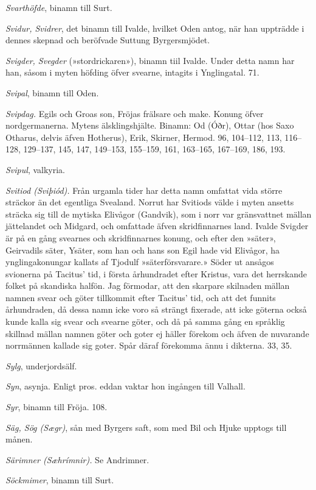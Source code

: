 \emph{Svarthöfde}, binamn till Surt.

\emph{Svidur, Svidrer}, det binamn till Ivalde, hvilket Oden antog, när
han uppträdde i dennes skepnad och beröfvade Suttung Byrgersmjödet.

\emph{Svigder, Svegder} (»stordrickaren»), binamn tiil Ivalde. Under
detta namn har han, såsom i myten höfding öfver svearne, intagits i
Ynglingatal. 71.

\emph{Svipal}, binamn till Oden.

\emph{Svipdag.} Egils och Groas son, Fröjas frälsare och make. Konung
öfver nordgermanerna. Mytens älsklingshjälte. Binamn: Od (Óðr), Ottar
(hos Saxo Otharus, delvis äfven Hotherus), Erik, Skirner, Hermod. 96,
104--112, 113, 116--128, 129--137, 145, 147, 149--153, 155--159, 161,
163--165, 167--169, 186, 193.

\emph{Svipul}, valkyria.

\emph{Svitiod (Sviþiód).} Från urgamla tider har detta namn omfattat
vida större sträckor än det egentliga Svealand. Norrut har Svitiods
välde i myten ansetts sträcka sig till de mytiska Elivågor (Gandvik),
som i norr var gränsvattnet mällan jättelandet och Midgard, och
omfattade äfven skridfinnarnes land. Ivalde Svigder är på en gång
svearnes och skridfinnarnes konung, och efter den »säter», Geirvadils
säter, Ysäter, som han och hans son Egil hade vid Elivågor, ha
ynglingakonungar kallats af Tjodulf »säterförsvarare.» Söder ut ansågos
svionerna på Tacitus' tid, i första århundradet efter Kristus, vara det
herrskande folket på skandiska halfön. Jag förmodar, att den skarpare
skilnaden mällan namnen svear och göter tillkommit efter Tacitus' tid,
och att det funnits århundraden, då dessa namn icke voro så strängt
fixerade, att icke göterna också kunde kalla sig svear och svearne
göter, och då på samma gång en språklig skillnad mällan namnen göter och
goter ej häller förekom och äfven de nuvarande norrmännen kallade sig
goter. Spår däraf förekomma ännu i dikterna. 33, 35.

\emph{Sylg}, underjordsälf.

\emph{Syn}, asynja. Enligt pros. eddan vaktar hon ingången till Valhall.

\emph{Syr}, binamn till Fröja. 108.

\emph{Säg, Sög (Sægr)}, sån med Byrgers saft, som med Bil och Hjuke
upptogs till månen.

\emph{Särimner (Sæhrímnir).} Se Andrimner.

\emph{Söckmimer}, binamn till Surt.

